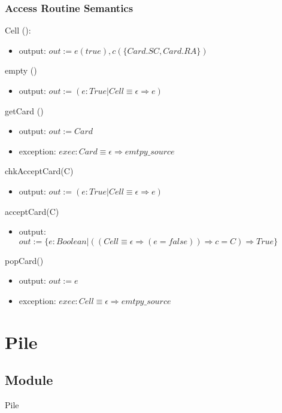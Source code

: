 \documentclass[12pt,fleqn]{article}
\begin{document}
\subsubsection* {Access Routine Semantics}

\noindent Cell ():
\begin{itemize}
\item output: $out := e(true), c(\{Card.SC, Card.RA\})$
\end{itemize}

\noindent empty ()
\begin{itemize}
\item output: $out := (e : True | Cell \equiv \epsilon \Rightarrow e)$
\end{itemize}

\noindent getCard ()
\begin{itemize}
\item output: $out:= Card$
\item exception: $exec: Card \equiv \epsilon \Rightarrow emtpy\_source$
\end{itemize}


\noindent chkAcceptCard(C)
\begin{itemize}
\item output: $out := (e :True| Cell \equiv \epsilon \Rightarrow e)$
\end{itemize}

\noindent acceptCard(C)
\begin{itemize}
\item output: $out := \{e: Boolean | ((Cell \equiv \epsilon \Rightarrow (e = false))\Rightarrow c = C)\Rightarrow True\}$
\end{itemize}

\noindent popCard()
\begin{itemize}
\item output: $out:= e$
\item exception: $exec: Cell \equiv \epsilon \Rightarrow emtpy\_source$
\end{itemize}



\section* {Pile}

\subsection* {Module}

Pile
\end{document}

